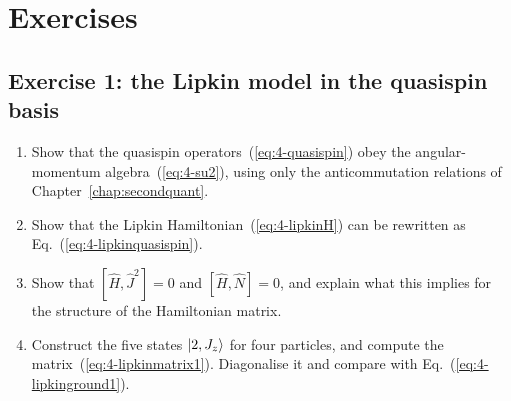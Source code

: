 \section{Exercises}

\subsection*{Exercise 1: the Lipkin model in the quasispin basis}
\label{ex:4-lipkin}

\begin{enumerate}
  \item[a)] Show that the quasispin operators~(\ref{eq:4-quasispin}) obey the
  angular-momentum algebra~(\ref{eq:4-su2}), using only the anticommutation
  relations of Chapter~\ref{chap:secondquant}.
  \item[b)] Show that the Lipkin Hamiltonian~(\ref{eq:4-lipkinH}) can be
  rewritten as Eq.~(\ref{eq:4-lipkinquasispin}).
  \item[c)] Show that $[\hat{H},\hat{J}^2]=0$ and $[\hat{H},\hat{N}]=0$, and
  explain what this implies for the structure of the Hamiltonian matrix.
  \item[d)] Construct the five states $\vert 2,J_z \rangle$ for four particles, and
  compute the matrix~(\ref{eq:4-lipkinmatrix1}).  Diagonalise it and compare
  with Eq.~(\ref{eq:4-lipkinground1}).
\end{enumerate}

